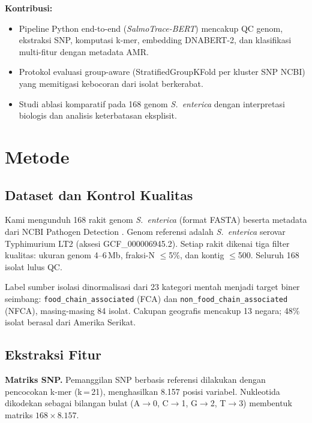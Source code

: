 \documentclass{article}
\begin{document}
\textbf{Kontribusi:}
\begin{itemize}
  \item Pipeline Python end-to-end (\textit{SalmoTrace-BERT}) mencakup QC
        genom, ekstraksi SNP, komputasi k-mer, embedding DNABERT-2, dan
        klasifikasi multi-fitur dengan metadata AMR.
  \item Protokol evaluasi group-aware (StratifiedGroupKFold per kluster SNP
        NCBI) yang memitigasi kebocoran dari isolat berkerabat.
  \item Studi ablasi komparatif pada 168 genom \textit{S.~enterica} dengan
        interpretasi biologis dan analisis keterbatasan eksplisit.
\end{itemize}

\section{Metode}

\subsection{Dataset dan Kontrol Kualitas}

Kami mengunduh 168 rakit genom \textit{S.~enterica} (format FASTA) beserta
metadata dari NCBI Pathogen Detection \cite{ncbi_pathogen}. Genom referensi
adalah \textit{S.~enterica} serovar Typhimurium LT2 (aksesi GCF\_000006945.2).
Setiap rakit dikenai tiga filter kualitas: ukuran genom 4--6\,Mb, fraksi-N
$\leq$5\%, dan kontig $\leq$500. Seluruh 168 isolat lulus QC.

Label sumber isolasi dinormalisasi dari 23 kategori mentah menjadi target
biner seimbang: \texttt{food\_chain\_associated} (FCA) dan
\texttt{non\_food\_chain\_associated} (NFCA), masing-masing 84 isolat.
Cakupan geografis mencakup 13 negara; 48\% isolat berasal dari Amerika Serikat.

\subsection{Ekstraksi Fitur}

\textbf{Matriks SNP.}
Pemanggilan SNP berbasis referensi dilakukan dengan pencocokan k-mer (k\,=\,21),
menghasilkan 8.157 posisi variabel. Nukleotida dikodekan sebagai bilangan bulat
(A$\to$0, C$\to$1, G$\to$2, T$\to$3) membentuk matriks $168\times8.157$.
\end{document}
